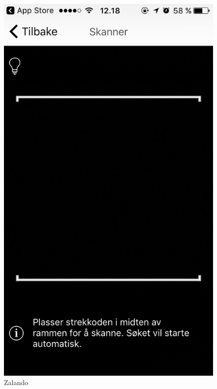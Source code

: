 \begin{figure}[H]
\includegraphics[scale=0.2]{images/inspiration/zalando3}
\centering %
\caption{Zalando}
\label{fig:Zalando}
\end{figure}

